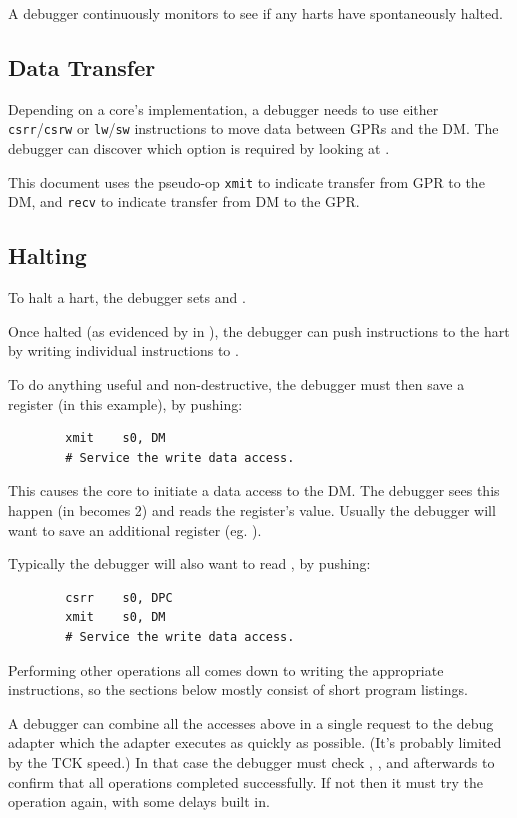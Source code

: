 \documentclass{article}
\begin{document}
A debugger continuously monitors \Rdasum to see if any harts have spontaneously
halted.

\subsection{Data Transfer}

Depending on a core's implementation, a debugger needs to use either {\tt
csrr}/{\tt csrw} or {\tt lw}/{\tt sw} instructions to move data between GPRs
and the DM. The debugger can discover which option is required by looking at
\Rhartinfo.

This document uses the pseudo-op {\tt xmit} to indicate transfer from GPR to
the DM, and {\tt recv} to indicate transfer from DM to the GPR.

\subsection{Halting}

To halt a hart, the debugger sets \Fhartid and \Fhalt.

Once halted (as evidenced by \Faccess in \Raccesscs), the debugger can push
instructions to the hart by writing individual instructions to \Rifetch.

To do anything useful and non-destructive, the debugger must then save a
register (\Szero in this example), by pushing:
\begin{verbatim}
        xmit    s0, DM
        # Service the write data access.
\end{verbatim}
This causes the core to initiate a data access to the DM. The debugger sees
this happen (\Faccess in \Raccesscs becomes 2) and reads the register's value.
Usually the debugger will want to save an additional register (eg. \Sone).

Typically the debugger will also want to read \Rpc, by pushing:
\begin{verbatim}
        csrr    s0, DPC
        xmit    s0, DM
        # Service the write data access.
\end{verbatim}

Performing other operations all comes down to writing the appropriate
instructions, so the sections below mostly consist of short program listings.

A debugger can combine all the accesses above in a single request to the debug
adapter which the adapter executes as quickly as possible. (It's probably
limited by the TCK speed.) In that case the debugger must check \Fioverflow,
\Fdunderflow, and \Fdoverflow afterwards to confirm that all operations
completed successfully. If not then it must try the operation again, with some
delays built in.
\end{document}
